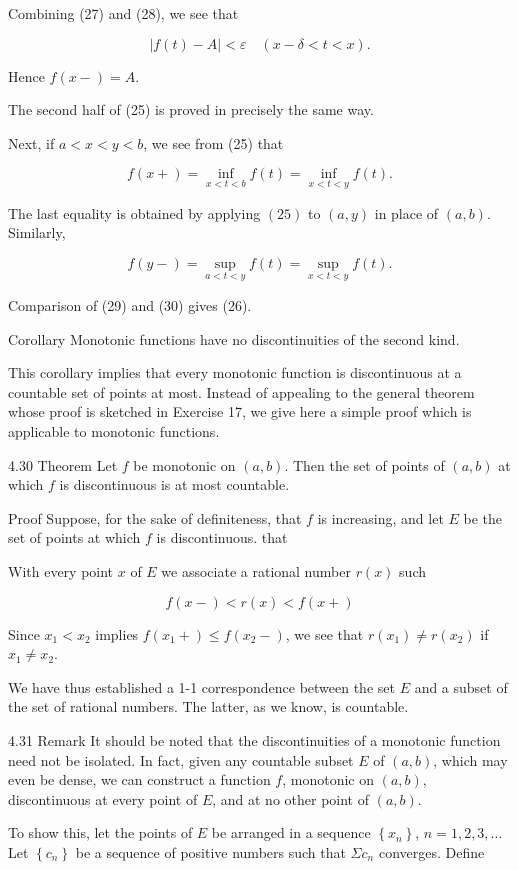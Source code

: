 \documentclass[10pt]{article}
\begin{document}
Combining (27) and (28), we see that

$$
|f(t)-A|<\varepsilon \quad(x-\delta<t<x) .
$$

Hence $f(x-)=A$.

The second half of (25) is proved in precisely the same way.

Next, if $a<x<y<b$, we see from (25) that

$$
f(x+)=\inf _{x<t<b} f(t)=\inf _{x<t<y} f(t) .
$$

The last equality is obtained by applying $(25)$ to $(a, y)$ in place of $(a, b)$. Similarly,

$$
f(y-)=\sup _{a<t<y} f(t)=\sup _{x<t<y} f(t) .
$$

Comparison of (29) and (30) gives (26).

Corollary Monotonic functions have no discontinuities of the second kind.

This corollary implies that every monotonic function is discontinuous at a countable set of points at most. Instead of appealing to the general theorem whose proof is sketched in Exercise 17, we give here a simple proof which is applicable to monotonic functions.

4.30 Theorem Let $f$ be monotonic on $(a, b)$. Then the set of points of $(a, b)$ at which $f$ is discontinuous is at most countable.

Proof Suppose, for the sake of definiteness, that $f$ is increasing, and let $E$ be the set of points at which $f$ is discontinuous. that

With every point $x$ of $E$ we associate a rational number $r(x)$ such

$$
f(x-)<r(x)<f(x+)
$$

Since $x_{1}<x_{2}$ implies $f\left(x_{1}+\right) \leq f\left(x_{2}-\right)$, we see that $r\left(x_{1}\right) \neq r\left(x_{2}\right)$ if $x_{1} \neq x_{2}$.

We have thus established a 1-1 correspondence between the set $E$ and a subset of the set of rational numbers. The latter, as we know, is countable.

4.31 Remark It should be noted that the discontinuities of a monotonic function need not be isolated. In fact, given any countable subset $E$ of $(a, b)$, which may even be dense, we can construct a function $f$, monotonic on $(a, b)$, discontinuous at every point of $E$, and at no other point of $(a, b)$.

To show this, let the points of $E$ be arranged in a sequence $\left\{x_{n}\right\}$, $n=1,2,3, \ldots$ Let $\left\{c_{n}\right\}$ be a sequence of positive numbers such that $\Sigma c_{n}$ converges. Define
\end{document}
